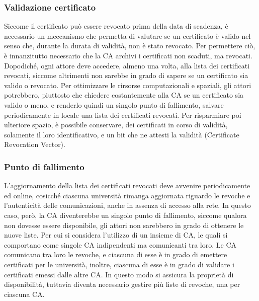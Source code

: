\documentclass[a4paper,12pt]{article}
\begin{document}
\subsubsection{Validazione certificato} Siccome il certificato può essere revocato prima della data di scadenza, è necessario un meccanismo che permetta di valutare se un certificato è valido nel senso che, durante la durata di validità, non è stato revocato. Per permettere ciò, è innanzitutto necessario che la CA archivi i certificati non scaduti, ma revocati. Dopodiché, ogni attore deve accedere, almeno una volta, alla lista dei certificati revocati, siccome altrimenti non sarebbe in grado di sapere se un certificato sia valido o revocato. Per ottimizzare le rirsorse computazionali e spaziali, gli attori potrebbero, piuttosto che chiedere costantemente alla CA se un certificato sia valido o meno, e renderlo quindi un singolo punto di fallimento, salvare periodicamente in locale una lista dei certificati revocati. Per risparmiare poi ulteriore spazio, è possibile conservare, dei certificati in corso di validità, solamente il loro identificativo, e un bit che ne attesti la validità (Certificate Revocation Vector).
\subsubsection{Punto di fallimento} L'aggiornamento della lista dei certificati revocati deve avvenire periodicamente ed online, cosicché ciascuna università rimanga aggiornata riguardo le revoche e l'autenticità delle comunicazioni, anche in assenza di accesso alla rete.
\newline In questo caso, però, la CA diventerebbe un singolo punto di fallimento, siccome qualora non dovesse essere disponibile, gli attori non sarebbero in grado di ottenere le nuove liste. Per cui si considera l'utilizzo di un insieme di CA, le quali si comportano come singole CA indipendenti ma comunicanti tra loro. Le CA comunicano tra loro le revoche, e ciascuna di esse è in grado di emettere certificati per le università, inoltre, ciascuna di esse è in grado di validare i certificati emessi dalle altre CA. In questo modo si assicura la proprietà di disponibilità, tuttavia diventa necessario gestire più liste di revoche, una per ciascuna CA.
\end{document}
